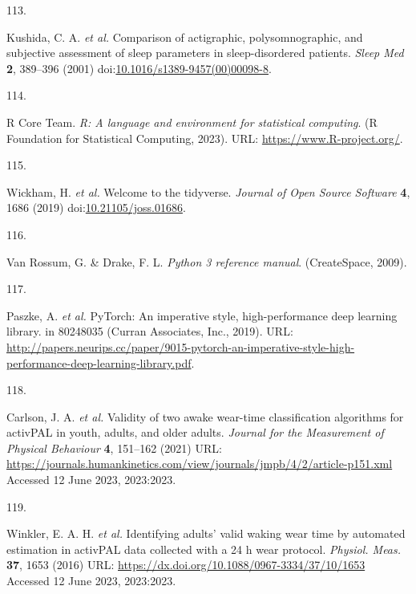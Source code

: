 \documentclass[
  9pt,
]{scrbook}
\newlength{\cslhangindent}
\newlength{\csllabelwidth}
\newlength{\cslentryspacingunit} %
\newenvironment{CSLReferences}[2] %
 {%
  \setlength{\parindent}{0pt}
  \ifodd #1
  \let\oldpar\par
  \def\par{\hangindent=\cslhangindent\oldpar}
  \fi
  \setlength{\parskip}{#2\cslentryspacingunit}
 }%
 {}
\newcommand{\CSLLeftMargin}[1]{\parbox[t]{\csllabelwidth}{#1}}
\newcommand{\CSLRightInline}[1]{\parbox[t]{\linewidth - \csllabelwidth}{#1}\break}
\begin{document}
\begin{CSLReferences}{0}{0}
\leavevmode{}%
\CSLLeftMargin{113. }%
\CSLRightInline{Kushida, C. A. \emph{et al.} Comparison of actigraphic,
polysomnographic, and subjective assessment of sleep parameters in
sleep-disordered patients. \emph{Sleep Med} \textbf{2}, 389--396 (2001)
doi:\href{https://doi.org/10.1016/s1389-9457(00)00098-8}{10.1016/s1389-9457(00)00098-8}.}

\leavevmode{}%
\CSLLeftMargin{114. }%
\CSLRightInline{R Core Team. \emph{R: A language and environment for
statistical computing}. (R Foundation for Statistical Computing, 2023).
URL: \url{https://www.R-project.org/}.}

\leavevmode{}%
\CSLLeftMargin{115. }%
\CSLRightInline{Wickham, H. \emph{et al.} Welcome to the tidyverse.
\emph{Journal of Open Source Software} \textbf{4}, 1686 (2019)
doi:\href{https://doi.org/10.21105/joss.01686}{10.21105/joss.01686}.}

\leavevmode{}%
\CSLLeftMargin{116. }%
\CSLRightInline{Van Rossum, G. \& Drake, F. L. \emph{Python 3 reference
manual}. (CreateSpace, 2009).}

\leavevmode{}%
\CSLLeftMargin{117. }%
\CSLRightInline{Paszke, A. \emph{et al.} PyTorch: An imperative style,
high-performance deep learning library. in 80248035 (Curran Associates,
Inc., 2019). URL:
\url{http://papers.neurips.cc/paper/9015-pytorch-an-imperative-style-high-performance-deep-learning-library.pdf}.}

\leavevmode{}%
\CSLLeftMargin{118. }%
\CSLRightInline{Carlson, J. A. \emph{et al.} Validity of two awake
wear-time classification algorithms for {activPAL} in youth, adults, and
older adults. \emph{Journal for the Measurement of Physical Behaviour}
\textbf{4}, 151--162 (2021) URL:
\url{https://journals.humankinetics.com/view/journals/jmpb/4/2/article-p151.xml}
Accessed 12 June 2023, 2023:2023.}

\leavevmode{}%
\CSLLeftMargin{119. }%
\CSLRightInline{Winkler, E. A. H. \emph{et al.} Identifying adults'
valid waking wear time by automated estimation in {activPAL} data
collected with a 24 h wear protocol. \emph{Physiol. Meas.} \textbf{37},
1653 (2016) URL: \url{https://dx.doi.org/10.1088/0967-3334/37/10/1653}
Accessed 12 June 2023, 2023:2023.}


\end{CSLReferences}
\end{document}
